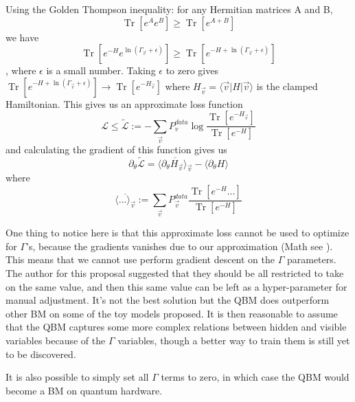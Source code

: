 \documentclass[letterpaper,11pt]{article}
\DeclareMathOperator{\Tr}{Tr}
\begin{document}
Using the Golden Thompson inequality: for any Hermitian matrices A and B,
\begin{equation}
\Tr[e^A e^B] \geq \Tr[e^{A + B}]
\end{equation}
we have
\begin{equation}
\Tr[e^{-H} e^{\ln(\Gamma_{\vec{v}} + \epsilon)}] \geq \Tr[e^{-H + \ln(\Gamma_{\vec{v}} + \epsilon)}]
\end{equation}, where $\epsilon$ is a small number. 
Taking $\epsilon$ to zero gives $\Tr[e^{-H + \ln(\Gamma_{\vec{v}} + \epsilon)}] \rightarrow \Tr[e^{-H_{\vec{v}}}]$ where $H_{\vec{v}} = \langle \vec{v} | H | \vec{v}\rangle$ is the clamped Hamiltonian. 
This gives us an approximate loss function 
\begin{equation}
\mathcal{L} \leq \tilde{\mathcal{L}} := -\sum_{\vec{v}} P_v^{data} \log{\frac{\Tr[e^{-H_{\vec{v}}}]}{\Tr[e^{-H}]}}
\end{equation} 
and calculating the gradient of this function gives us
\begin{equation}
\partial_{\theta} \tilde{\mathcal{L}} = \overline{\langle \partial_{\theta} H_{\vec{v}}\rangle_{\vec{v}}} - \langle \partial_{\theta} H\rangle
\end{equation}
where
\begin{equation}
\overline{\langle ... \rangle_{\vec{v}}} := \sum_{\vec{v}} P_{\vec{v}}^{data} \frac{\Tr[e^{-H} ...]}{\Tr[e^{-H}]}
\end{equation}

One thing to notice here is that this approximate loss cannot be used to optimize for $\Gamma$'s, because the gradients vanishes due to our approximation (Math see \cite{QBM}). This means that we cannot use perform gradient descent on the $\Gamma$ parameters. The author for this proposal suggested that they should be all restricted to take on the same value, and then this same value can be left as a hyper-parameter for manual adjustment. It's not the best solution but the QBM does outperform other BM on some of the toy models \cite{QBM} proposed. It is then reasonable to assume that the QBM captures some more complex relations between hidden and visible variables because of the $\Gamma$ variables, though a better way to train them is still yet to be discovered. \par

It is also possible to simply set all $\Gamma$ terms to zero, in which case the QBM would become a BM on quantum hardware. \par
\end{document}
